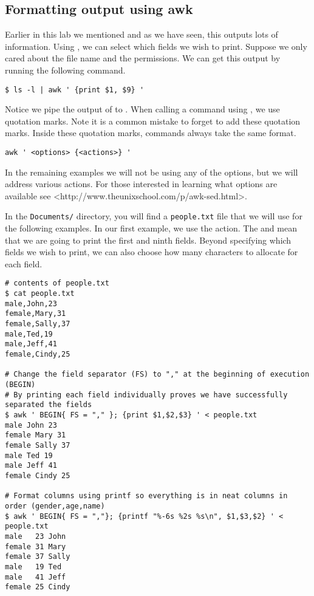 \subsection*{Formatting output using awk}
Earlier in this lab we mentioned  and as we have seen, this outputs lots of information.
Using , we can select which fields we wish to print.
Suppose we only cared about the file name and the permissions.
We can get this output by running the following command.

\begin{lstlisting}
$ ls -l | awk ' {print $1, $9} '
\end{lstlisting}

Notice we pipe the output of  to .
When calling a command using , we use quotation marks.
Note it is a common mistake to forget to add these quotation marks.
Inside these quotation marks, commands always take the same format.

\begin{lstlisting}
awk ' <options> {<actions>} '
\end{lstlisting}

In the remaining examples we will not be using any of the options, but we will address various actions.
For those interested in learning what options are available see <http://www.theunixschool.com/p/awk-sed.html>.

In the \texttt{Documents/} directory, you will find a \texttt{people.txt} file that we will use for the following examples.
In our first example, we use the  action.
The  and  mean that we are going to print the first and ninth fields.
Beyond specifying which fields we wish to print, we can also choose how many characters to allocate for each field.


\begin{lstlisting}
# contents of people.txt
$ cat people.txt
male,John,23
female,Mary,31
female,Sally,37
male,Ted,19
male,Jeff,41
female,Cindy,25

# Change the field separator (FS) to "," at the beginning of execution (BEGIN)
# By printing each field individually proves we have successfully separated the fields
$ awk ' BEGIN{ FS = "," }; {print $1,$2,$3} ' < people.txt
male John 23
female Mary 31
female Sally 37
male Ted 19
male Jeff 41
female Cindy 25

# Format columns using printf so everything is in neat columns in order (gender,age,name)
$ awk ' BEGIN{ FS = ","}; {printf "%-6s %2s %s\n", $1,$3,$2} ' < people.txt
male   23 John
female 31 Mary
female 37 Sally
male   19 Ted
male   41 Jeff
female 25 Cindy
\end{lstlisting}

